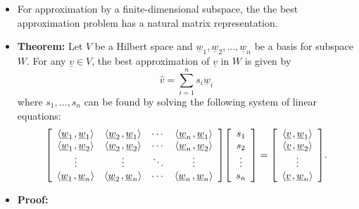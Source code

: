 \documentclass[11pt,twoside]{report}
\newcommand{\vecnot}{\underline}
\newcommand{\inner}[2]{{\left\langle #1 \mskip2mu , #2 \right\rangle}}
\begin{document}
\begin{itemize}

\item For approximation by  a  finite-dimensional  subspace, the the best approximation problem has a natural matrix representation. 



\item  \textbf{Theorem:} Let $V$ be a Hilbert space and $\vecnot{w}_1 ,\vecnot{w}_2 , \ldots, \vecnot{w}_n$ be a basis for subspace $W$.
For any $\vecnot{v} \in V$, the best approximation of $\vecnot{v}$ in $W$ is given by
\[
\hat{v} = \sum_{i=1}^n s_i \vecnot{w}_i
\]
where $s_1, \dots, s_n$ can be found by solving the following system of linear equations: 
\begin{equation} \label{eq:least_squares}
\left[ \begin{array}{cccc}
\inner{ \vecnot{w}_1 }{ \vecnot{w}_1 }
& \inner{ \vecnot{w}_2 }{ \vecnot{w}_1 } & \cdots
& \inner{ \vecnot{w}_n }{ \vecnot{w}_1 } \\
\inner{ \vecnot{w}_1 }{ \vecnot{w}_2 }
& \inner{ \vecnot{w}_2 }{ \vecnot{w}_2 } & \cdots
& \inner{ \vecnot{w}_n }{ \vecnot{w}_2 } \\
\vdots & \vdots & \ddots & \vdots \\
\inner{ \vecnot{w}_1 }{ \vecnot{w}_n }
& \inner{ \vecnot{w}_2 }{ \vecnot{w}_n } & \cdots
& \inner{ \vecnot{w}_n }{ \vecnot{w}_n }
\end{array} \right]
\left[ \begin{array}{c}
s_1 \\ s_2 \\ \vdots \\ s_n \end{array} \right]
= \left[ \begin{array}{c}
\inner{ \vecnot{v} }{ \vecnot{w}_1 } \\
\inner{ \vecnot{v} }{ \vecnot{w}_2 } \\ \vdots \\
\inner{ \vecnot{v} }{ \vecnot{w}_n } \end{array} \right] .
\end{equation}

\item \textbf{Proof:} 


\end{itemize}
\end{document}
